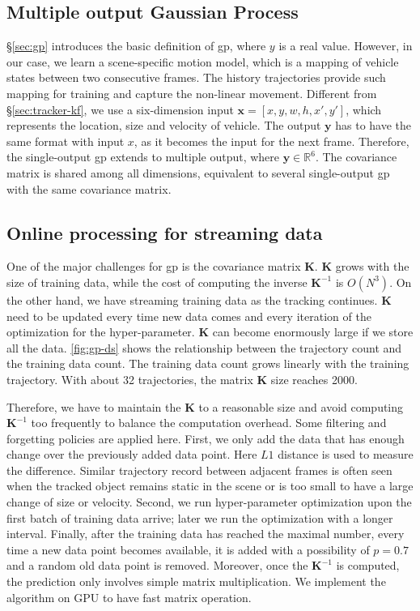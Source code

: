 \subsection{Multiple output Gaussian Process}

\S\ref{sec:gp} introduces the basic definition of \gls{gp}, where $y$ is a real value.
However, in our case, we learn a scene-specific motion model, which is a mapping of vehicle states between two consecutive frames. 
The history trajectories provide such mapping for training and capture the non-linear movement.
Different from \S\ref{sec:tracker-kf}, we use a six-dimension input $\mathbf{x} = [x, y, w, h, x', y']$, which represents the location, size and velocity of vehicle. 
The output $\mathbf{y}$ has to have the same format with input $x$, as it becomes the input for the next frame.
Therefore, the single-output \gls{gp} extends to multiple output, where $\mathbf{y} \in \mathbb{R}^{6}$. 
The covariance matrix is shared among all dimensions, equivalent to several single-output \gls{gp} with the same 
covariance matrix.

\subsection{Online processing for streaming data}

One of the major challenges for \gls{gp} is the covariance matrix $\mathbf{K}$. 
$\mathbf{K}$ grows with the size of training data, while the cost of computing the inverse $\mathbf{K}^{-1}$ is $O(N^3)$.
On the other hand, we have streaming training data as the tracking continues. 
$\mathbf{K}$ need to be updated every time new data comes and every iteration of the optimization for the hyper-parameter.
$\mathbf{K}$ can become enormously large if we store all the data. 
\ref{fig:gp-ds} shows the relationship between the trajectory count and the training data count. 
The training data count grows linearly with the training trajectory.
With about 32 trajectories, the matrix $\mathbf{K}$ size reaches 2000. 


Therefore, we have to maintain the $\mathbf{K}$ to a reasonable size and avoid computing $\mathbf{K}^{-1}$ too frequently to balance the computation overhead.
Some filtering and forgetting policies are applied here.
First, we only add the data that has enough change over the previously added data point.
Here $L1$ distance is used to measure the difference. 
Similar trajectory record between adjacent frames is often seen when the tracked object remains static in the scene or is too small to have a large change of size or velocity.
Second, we run hyper-parameter optimization upon the first batch of training data arrive; later we run the optimization with a longer interval.
Finally, after the training data has reached the maximal number, every time a new data point becomes available, it is added with a possibility of $p = 0.7$ and a random old data point is removed.
Moreover, once the $\mathbf{K}^{-1}$ is computed, the prediction only involves simple matrix multiplication.
We implement the algorithm on GPU to have fast matrix operation.

